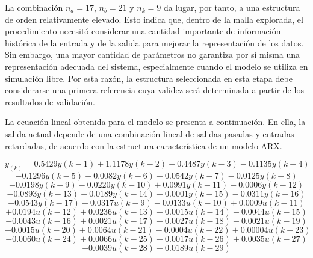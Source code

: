 \documentclass[11pt]{report}
\begin{document}
La combinación $n_a=17$, $n_b=21$ y $n_k=9$ da lugar, por tanto, a una estructura de orden relativamente elevado. Esto indica que, dentro de la malla explorada, el procedimiento necesitó considerar una cantidad importante de información histórica de la entrada y de la salida para mejorar la representación de los datos. Sin embargo, una mayor cantidad de parámetros no garantiza por sí misma una representación adecuada del sistema, especialmente cuando el modelo se utiliza en simulación libre. Por esta razón, la estructura seleccionada en esta etapa debe considerarse una primera referencia cuya validez será determinada a partir de los resultados de validación.



La ecuación lineal obtenida para el modelo se presenta a continuación. En ella, la salida actual depende de una combinación lineal de salidas pasadas y entradas retardadas, de acuerdo con la estructura característica de un modelo ARX.


$$y_(k)= 0.5429y(k−1)+1.1178y(k−2)−0.4487y(k−3)−0.1135y(k−4)$$ 
$$−0.1296y(k−5)+0.0082y(k−6)+0.0542y(k−7)−0.0125y(k−8) $$
$$−0.0198y(k−9)−0.0220y(k−10)+0.0991y(k−11)−0.0006y(k−12) $$
$$−0.0893y(k−13)−0.0189y(k−14)+0.0001y(k−15)−0.0311y(k−16) $$
$$+0.0543y(k−17)−0.0317u(k−9)−0.0133u(k−10)+0.0009u(k−11)$$
$$+0.0194u(k−12)+0.0236u(k−13)−0.0015u(k−14)−0.0044u(k−15)$$
$$−0.0043u(k−16)+0.0021u(k−17)−0.0027u(k−18)−0.0021u(k−19)$$
$$+0.0015u(k−20)+0.0064u(k−21)−0.0004u(k−22)+0.00004u(k−23)$$ 
$$−0.0060u(k−24)+0.0066u(k−25)−0.0017u(k−26)+0.0035u(k−27)$$
$$+0.0039u(k−28)  −0.0189u(k−29)$$
\end{document}
